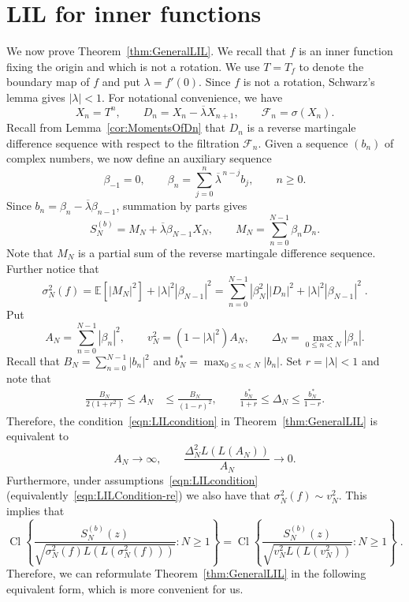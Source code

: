 \documentclass[12pt, reqno, final, a4paper]{amsart}
\theoremstyle{plain}
\theoremstyle{definition}
\theoremstyle{remark}
\DeclareMathOperator{\Cl}{Cl}
\newcommand{\E}{\mathbb E}
\newcommand{\1}{\mathbf 1}
\begin{document}
\section{LIL for inner functions}\label{Sec:LILForInnerFunction}
We now prove Theorem~\ref{thm:GeneralLIL}. We recall that $f$ is an inner function fixing the origin and which is not a rotation. We use $T=T_f$ to denote the boundary map of $f$ and put $\lambda = f'(0)$. Since $f$ is not a rotation, Schwarz's lemma gives $|\lambda|<1$. For notational convenience, we have
\[
 X_n=T^n,\qquad D_n=X_n-\overline\lambda X_{n+1},
 \qquad \mathcal F_n=\sigma(X_n).
\]
Recall from Lemma~\ref{cor:MomentsOfDn} that $D_n$ is a reverse martingale difference sequence with respect to the filtration $\mathcal{F}_n$.  Given a sequence $(b_n)$ of complex numbers, we now define an auxiliary sequence
\[
 \beta_{-1}=0,
 \qquad
 \beta_n=\sum_{j=0}^n\overline\lambda^{\,n-j}b_j,
 \qquad n\ge0.
\]
Since $b_n=\beta_n-\overline\lambda\beta_{n-1}$, summation by parts gives
\begin{equation}\label{eqn:SNvsMN}
 S_N^{(b)}=M_N+\overline\lambda\beta_{N-1}X_N,
 \qquad
 M_N=\sum_{n=0}^{N-1}\beta_nD_n.
\end{equation}
Note that $M_N$ is a partial sum of the reverse martingale difference sequence. Further notice that 
\[
\sigma_N^2(f) = \E[|M_N|^2]+ |\lambda|^2|\beta_{N-1}|^2 = \sum_{n=0}^{N-1}|\beta_N^2||D_n|^2+|\lambda|^2|\beta_{N-1}|^2\;.
\]
Put
\begin{equation*}
 A_N=\sum_{n=0}^{N-1}|\beta_n|^2,
 \qquad
 v_N^2=(1-|\lambda|^2)A_N,
 \qquad
 \Delta_N=\max_{0\le n<N}|\beta_n|.
\end{equation*}
Recall that $B_N=\sum_{n=0}^{N-1}|b_n|^2$ and $b_N^*=\max_{0\le n<N}|b_n|$. Set $r=|\lambda|<1$ and note that
 \begin{align*}
  \frac{B_N}{2(1+r^2)}\leq A_N&\le\frac{B_N}{(1-r)^2},\qquad  \frac{b_N^{*}}{1+r}\leq  \Delta_N\le\frac{b_N^*}{1-r}. 
 \end{align*}
 Therefore, the condition~\eqref{eqn:LILcondition} in Theorem~\ref{thm:GeneralLIL} is equivalent to
 \begin{equation}\label{eqn:LILCondition-re}
  A_N\to\infty,
  \qquad
  \frac{\Delta_N^2L(L(A_N))}{A_N}\to0.
 \end{equation}
Furthermore, under assumptions~\eqref{eqn:LILcondition} (equivalently~\eqref{eqn:LILCondition-re}) we also have that $\sigma_N^2(f)\sim v_N^2$. 
This implies that 
\[
\Cl\left\{
 \frac{S_N^{(b)}(z)}{\sqrt{\sigma_N^2(f)L(L(\sigma_N^2(f)))}}:N\ge1
 \right\}= \Cl\left\{
 \frac{S_N^{(b)}(z)}{\sqrt{v_N^2L(L(v_N^2))}}:N\ge1
 \right\}\;.
\]
Therefore, we can reformulate Theorem~\ref{thm:GeneralLIL} in the following equivalent form, which is more convenient for us. 
\end{document}
